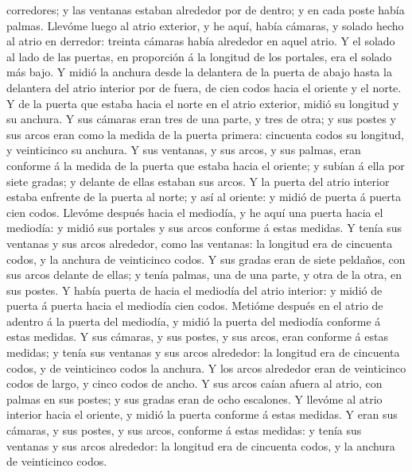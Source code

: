 corredores; y las ventanas estaban alrededor por de dentro; y en cada
poste había palmas.  Llevóme luego al atrio exterior, y
he aquí, había cámaras, y solado hecho al atrio en derredor: treinta
cámaras había alrededor en aquel atrio.  Y el solado al
lado de las puertas, en proporción á la longitud de los portales, era el
solado más bajo.  Y midió la anchura desde la delantera
de la puerta de abajo hasta la delantera del atrio interior por de
fuera, de cien codos hacia el oriente y el norte.  Y de
la puerta que estaba hacia el norte en el atrio exterior, midió su
longitud y su anchura.  Y sus cámaras eran tres de una
parte, y tres de otra; y sus postes y sus arcos eran como la medida de
la puerta primera: cincuenta codos su longitud, y veinticinco su
anchura.  Y sus ventanas, y sus arcos, y sus palmas, eran
conforme á la medida de la puerta que estaba hacia el oriente; y subían
á ella por siete gradas; y delante de ellas estaban sus arcos.
 Y la puerta del atrio interior estaba enfrente de la
puerta al norte; y así al oriente: y midió de puerta á puerta cien
codos.  Llevóme después hacia el mediodía, y he aquí una
puerta hacia el mediodía: y midió sus portales y sus arcos conforme á
estas medidas.  Y tenía sus ventanas y sus arcos
alrededor, como las ventanas: la longitud era de cincuenta codos, y la
anchura de veinticinco codos.  Y sus gradas eran de siete
peldaños, con sus arcos delante de ellas; y tenía palmas, una de una
parte, y otra de la otra, en sus postes.  Y había puerta
de hacia el mediodía del atrio interior: y midió de puerta á puerta
hacia el mediodía cien codos.  Metióme después en el
atrio de adentro á la puerta del mediodía, y midió la puerta del
mediodía conforme á estas medidas.  Y sus cámaras, y sus
postes, y sus arcos, eran conforme á estas medidas; y tenía sus ventanas
y sus arcos alrededor: la longitud era de cincuenta codos, y de
veinticinco codos la anchura.  Y los arcos alrededor eran
de veinticinco codos de largo, y cinco codos de ancho.  Y
sus arcos caían afuera al atrio, con palmas en sus postes; y sus gradas
eran de ocho escalones.  Y llevóme al atrio interior
hacia el oriente, y midió la puerta conforme á estas medidas.
 Y eran sus cámaras, y sus postes, y sus arcos, conforme
á estas medidas: y tenía sus ventanas y sus arcos alrededor: la longitud
era de cincuenta codos, y la anchura de veinticinco codos.
